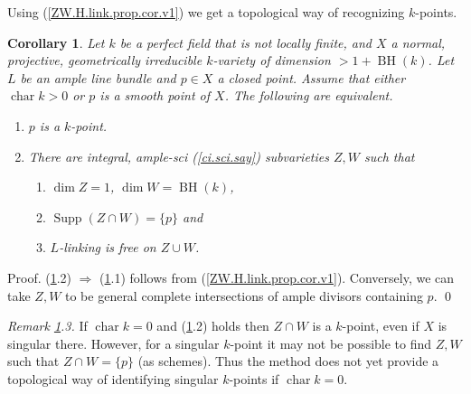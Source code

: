 \documentclass{amsart}
\newtheorem{cor}[thm]{Corollary}
\theoremstyle{definition}
\theoremstyle{remark}
\newcommand{\supp}[0]{\operatorname{Supp}}
\newcommand{\chr}[0]{\operatorname{char}}
\newcommand{\BH}[0]{\operatorname{BH}}
\begin{document}
Using (\ref{ZW.H.link.prop.cor.v1})
we get a topological way of recognizing $k$-points.




\begin{cor} \label{ZW.H.link.prop.1p.cor.2}
Let $k$ be a perfect
field  that  is not locally finite, and 
 $X$  a  normal, projective, geometrically irreducible  $k$-variety of dimension $>1+\BH(k)$. 
Let $L$ be an ample line bundle and $p\in X$  a closed point. 
Assume that either $\chr k>0$ or $p$ is  a smooth point of $X$. 
The following are equivalent.
\begin{enumerate}
\item $p$ is a $k$-point.
\item  There are integral, ample-sci (\ref{ci.sci.say}) 
subvarieties
$Z, W$   such that 
\begin{enumerate}
\item $\dim Z= 1$,  $\dim W  = \BH(k)$,
\item  $\supp(Z\cap W)=\{p\}$ and 
\item $L$-linking is free on $Z\cup W$. 
\end{enumerate}
\end{enumerate}
\end{cor}

Proof.  (\ref{ZW.H.link.prop.1p.cor.2}.2) $\Rightarrow$ (\ref{ZW.H.link.prop.1p.cor.2}.1) follows from (\ref{ZW.H.link.prop.cor.v1}).
Conversely, we can take $Z, W$ to be general complete intersections of  ample divisors  containing $p$. \qed

\medskip

{\it Remark \ref{ZW.H.link.prop.1p.cor.2}.3.} If $\chr k=0$ and (\ref{ZW.H.link.prop.1p.cor.2}.2) holds then
$Z\cap W$ is a $k$-point, even if $X$ is singular there. However, 
for a singular $k$-point it may not be possible to find $Z, W$  such that $Z\cap W=\{p\}$ (as schemes). 
Thus the method does not yet provide a topological way of identifying singular $k$-points if $\chr k=0$.

\medskip
\end{document}
